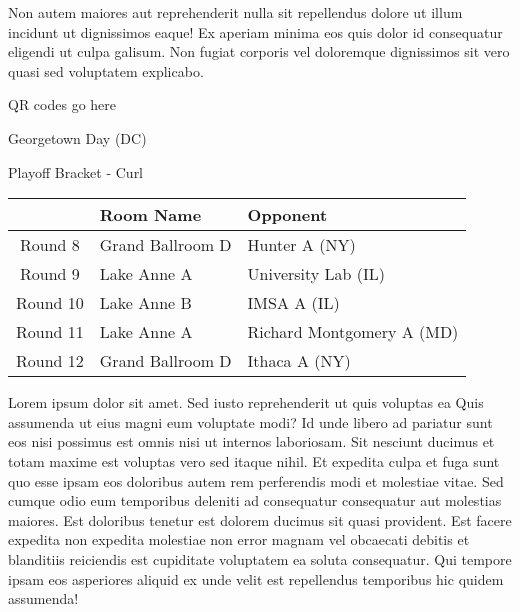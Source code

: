 \documentclass{article}%
\begin{document}
\newline%
Non autem maiores aut reprehenderit nulla sit repellendus dolore ut illum incidunt ut dignissimos eaque! Ex aperiam minima eos quis dolor id consequatur eligendi ut culpa galisum. Non fugiat corporis vel doloremque dignissimos sit vero quasi sed voluptatem explicabo.\newline%
\newline%
%
\vspace*{30pt}%
\begin{center}%
\begin{Huge}%
QR codes go here%
\end{Huge}%
\end{center}%
\newpage%
\begin{center}%
\begin{Huge}%
Georgetown Day (DC)%
\end{Huge}%
\vspace*{8pt}%
\linebreak%
\begin{Large}%
Playoff Bracket {-} Curl%
\end{Large}%
\end{center}%
%
\begin{tabularx}{\textwidth}{|c|Y|Y|}%
\hline%
&Room Name&Opponent\\%
\hline%
Round 8&Grand Ballroom D&Hunter A (NY)\\%
Round 9&Lake Anne A&University Lab (IL)\\%
Round 10&Lake Anne B&IMSA A (IL)\\%
Round 11&Lake Anne A&Richard Montgomery A (MD)\\%
Round 12&Grand Ballroom D&Ithaca A (NY)\\%
\hline%
\end{tabularx}%
\vspace*{8pt}%
\linebreak%
\newline%
\newline%
Lorem ipsum dolor sit amet. Sed iusto reprehenderit ut quis voluptas ea Quis assumenda ut eius magni eum voluptate modi? Id unde libero ad pariatur sunt eos nisi possimus est omnis nisi ut internos laboriosam. Sit nesciunt ducimus et totam maxime est voluptas vero sed itaque nihil. Et expedita culpa et fuga sunt quo esse ipsam eos doloribus autem rem perferendis modi et molestiae vitae.\newline%
\newline%
Sed cumque odio eum temporibus deleniti ad consequatur consequatur aut molestias maiores. Est doloribus tenetur est dolorem ducimus sit quasi provident. Est facere expedita non expedita molestiae non error magnam vel obcaecati debitis et blanditiis reiciendis est cupiditate voluptatem ea soluta consequatur. Qui tempore ipsam eos asperiores aliquid ex unde velit est repellendus temporibus hic quidem assumenda!\newline%
\end{document}
